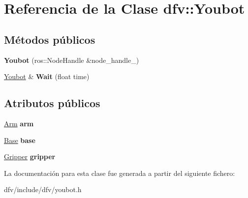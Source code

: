 \hypertarget{classdfv_1_1Youbot}{\section{\-Referencia de la \-Clase dfv\-:\-:\-Youbot}
\label{classdfv_1_1Youbot}
}
\subsection*{\-Métodos públicos}
\begin{DoxyCompactItemize}
\item 
\hypertarget{classdfv_1_1Youbot_a78a15bc3779533fc764d2bb6e4e9de63}{{\bfseries \-Youbot} (ros\-::\-Node\-Handle \&node\-\_\-handle\-\_\-)}\label{classdfv_1_1Youbot_a78a15bc3779533fc764d2bb6e4e9de63}

\item 
\hypertarget{classdfv_1_1Youbot_ad1364d8b6b0b7cfd7a7d1090d01a4149}{\hyperlink{classdfv_1_1Youbot}{\-Youbot} \& {\bfseries \-Wait} (float time)}\label{classdfv_1_1Youbot_ad1364d8b6b0b7cfd7a7d1090d01a4149}

\end{DoxyCompactItemize}
\subsection*{\-Atributos públicos}
\begin{DoxyCompactItemize}
\item 
\hypertarget{classdfv_1_1Youbot_a546a5dd73d92a78e3e7a7e5e657e20c4}{\hyperlink{classdfv_1_1Arm}{\-Arm} {\bfseries arm}}\label{classdfv_1_1Youbot_a546a5dd73d92a78e3e7a7e5e657e20c4}

\item 
\hypertarget{classdfv_1_1Youbot_ae9afdaa79ea3b7d9ca16f1f787846c38}{\hyperlink{classdfv_1_1Base}{\-Base} {\bfseries base}}\label{classdfv_1_1Youbot_ae9afdaa79ea3b7d9ca16f1f787846c38}

\item 
\hypertarget{classdfv_1_1Youbot_a82c9280fd7f7b981e3bec85a4db32b5f}{\hyperlink{classdfv_1_1Gripper}{\-Gripper} {\bfseries gripper}}\label{classdfv_1_1Youbot_a82c9280fd7f7b981e3bec85a4db32b5f}

\end{DoxyCompactItemize}


\-La documentación para esta clase fue generada a partir del siguiente fichero\-:\begin{DoxyCompactItemize}
\item 
dfv/include/dfv/youbot.\-h\end{DoxyCompactItemize}
